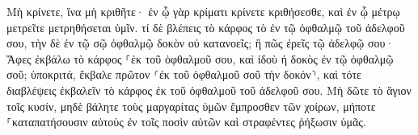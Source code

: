 \documentclass{openreader}
\begin{document}
Μὴ κρίνετε, ἵνα μὴ κριθῆτε· 
ἐν ᾧ γὰρ κρίματι κρίνετε κριθήσεσθε, καὶ ἐν ᾧ μέτρῳ μετρεῖτε μετρηθήσεται ὑμῖν. 
τί δὲ βλέπεις τὸ κάρφος τὸ ἐν τῷ ὀφθαλμῷ τοῦ ἀδελφοῦ σου, τὴν δὲ ἐν τῷ σῷ ὀφθαλμῷ δοκὸν οὐ κατανοεῖς; 
ἢ πῶς ἐρεῖς τῷ ἀδελφῷ σου· Ἄφες ἐκβάλω τὸ κάρφος ⸀ἐκ τοῦ ὀφθαλμοῦ σου, καὶ ἰδοὺ ἡ δοκὸς ἐν τῷ ὀφθαλμῷ σοῦ; 
ὑποκριτά, ἔκβαλε πρῶτον ⸂ἐκ τοῦ ὀφθαλμοῦ σοῦ τὴν δοκόν⸃, καὶ τότε διαβλέψεις ἐκβαλεῖν τὸ κάρφος ἐκ τοῦ ὀφθαλμοῦ τοῦ ἀδελφοῦ σου. 
Μὴ δῶτε τὸ ἅγιον τοῖς κυσίν, μηδὲ βάλητε τοὺς μαργαρίτας ὑμῶν ἔμπροσθεν τῶν χοίρων, μήποτε ⸀καταπατήσουσιν αὐτοὺς ἐν τοῖς ποσὶν αὐτῶν καὶ στραφέντες ῥήξωσιν ὑμᾶς. 
\end{document}
